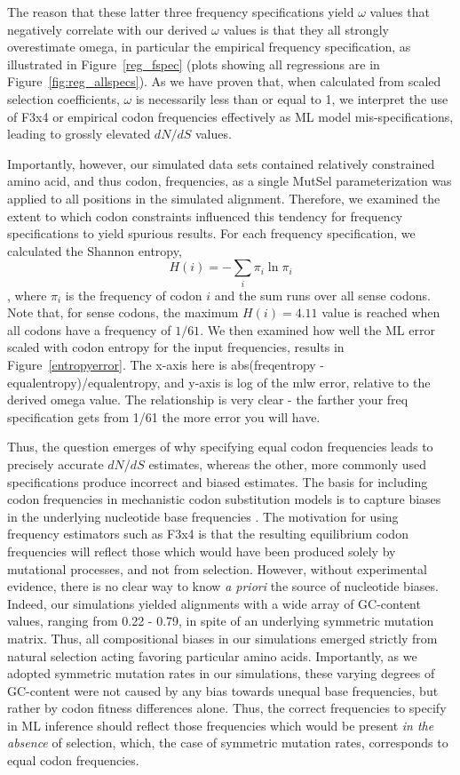 \documentclass[11pt]{article}
\begin{document}
The reason that these latter three frequency specifications yield $\omega$ values that negatively correlate with our derived $\omega$ values is that they all strongly overestimate omega, in particular the empirical frequency specification, as illustrated in Figure~\ref{reg_fspec} (plots showing all regressions are in Figure~\ref{fig:reg_allspecs}). As we have proven that, when calculated from scaled selection coefficients, $\omega$ is necessarily less than or equal to 1, we interpret the use of F3x4 or empirical codon frequencies effectively as ML model mis-specifications, leading to grossly elevated $dN/dS$ values. 


Importantly, however, our simulated data sets contained relatively constrained amino acid, and thus codon, frequencies, as a single MutSel parameterization was applied to all positions in the simulated alignment. Therefore, we examined the extent to which codon constraints influenced this tendency for frequency specifications to yield spurious results.
For each frequency specification, we calculated the Shannon entropy, \begin{equation} H(i) = - \sum_i \pi_i \ln \pi_i \end{equation}, where $\pi_i$ is the frequency of codon $i$ and the sum runs over all sense codons. Note that, for sense codons, the maximum $H(i) = 4.11$ value is reached when all codons have a frequency of $1/61$. We then examined how well the ML error scaled with codon entropy for the input frequencies, results in Figure~\ref{entropyerror}. The x-axis here is abs(freqentropy - equalentropy)/equalentropy, and y-axis is log of the mlw error, relative to the derived omega value. The relationship is very clear - the farther your freq specification gets from 1/61 the more error you will have.

Thus, the question emerges of why specifying equal codon frequencies leads to precisely accurate $dN/dS$ estimates, whereas the other, more commonly used specifications produce incorrect and biased estimates. The basis for including codon frequencies in mechanistic codon substitution models is to capture biases in the underlying nucleotide base frequencies \cite{YN00, Yang2006}. 
The motivation for using frequency estimators such as F3x4 is that the resulting equilibrium codon frequencies will reflect those which would have been produced solely by mutational processes, and not from selection. However, without experimental evidence, there is no clear way to know \textit{a priori} the source of nucleotide biases. Indeed, our simulations yielded alignments with a wide array of GC-content values, ranging from 0.22 - 0.79, in spite of an underlying symmetric mutation matrix. Thus, all compositional biases in our simulations emerged strictly from natural selection acting favoring particular amino acids. 
 Importantly, as we adopted symmetric mutation rates in our simulations, these varying degrees of GC-content were not caused by any bias towards unequal base frequencies, but rather by codon fitness differences alone. Thus, the correct frequencies to specify in ML inference should reflect those frequencies which would be present \textit{in the absence} of selection, which, the case of symmetric mutation rates, corresponds to equal codon frequencies.
\end{document}
